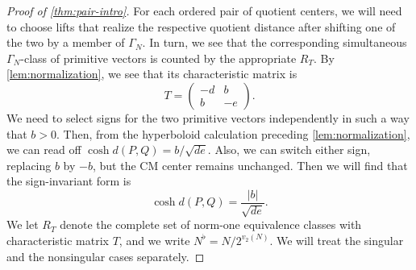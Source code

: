 \documentclass[11pt,reqno]{amsart}
\theoremstyle{definition}
\begin{document}
\begin{proof}[Proof of \cref{thm:pair-intro}] For each ordered pair of quotient centers, we will need to choose lifts that realize the
respective quotient distance after shifting one of the two by a member of
$\Gamma_N$. In turn, we see that the corresponding simultaneous $\Gamma_N$-class of
primitive vectors is counted by the appropriate $R_T$. By \cref{lem:normalization}, we see that its characteristic matrix is
\[
 T=\begin{pmatrix}-d&b\\ b&-e\end{pmatrix}.
\]
We need to select signs for the two primitive vectors independently in such a way
that $b>0$.
Then, from the hyperboloid calculation preceding \cref{lem:normalization}, we can
read off $\cosh d(P,Q)=b/\sqrt{de}$.  Also, we can switch either sign, replacing $b$ by $-b$, but the CM center
remains unchanged. 
Then we will find that the sign-invariant form is
\begin{equation}\label{eq:distance-b} \cosh d(P,Q)=\frac{|b|}{\sqrt{de}}.
\end{equation}
We let $R_T$ denote the complete set of norm-one equivalence classes with
characteristic matrix $T$, and we write $N^\flat=N/2^{v_2(N)}$. We will treat the
singular and the nonsingular cases separately.


\end{proof}
\end{document}
